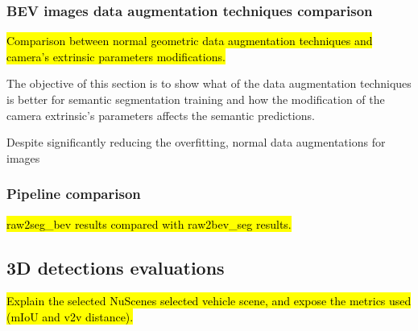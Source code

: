 \subsubsection{BEV images data augmentation techniques comparison}
\hl{Comparison between normal geometric data augmentation techniques and camera's extrinsic parameters modifications.}

The objective of this section is to show what of the data augmentation techniques is better for  semantic segmentation training and how the modification of the camera extrinsic's parameters affects the semantic predictions.

Despite significantly reducing the overfitting, normal data augmentations for  images


\subsubsection{Pipeline comparison}
\hl{raw2seg\_bev results compared with raw2bev\_seg results.}





\subsection{3D detections evaluations}
\hl{Explain the selected NuScenes selected vehicle scene, and expose the metrics used (mIoU and v2v distance).}


